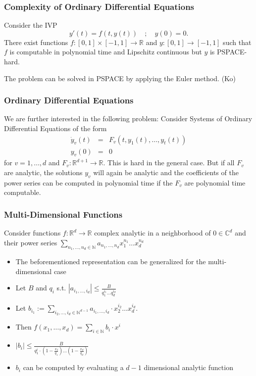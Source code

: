 \documentclass[handout,xcolor=pdftex,dvipsnames,table]{beamer}
\newcommand{\N}{\ensuremath{\mathbb{N}}}
\newcommand{\RR}{\ensuremath{\mathbb{R}}}
\newcommand{\C}{\ensuremath{\mathbb{C}}}
\newcommand{\abs}[1]{\left|#1\right|}
\begin{document}
\begin{frame}
\frametitle{Complexity of Ordinary Differential Equations}
\begin{theorem}[Kawamura, 2010]
Consider the IVP
$$
y'(t)=f(t,y(t)) \quad;\quad y(0)=0.
$$
\pause
There exist functions $f: [0,1] \times [-1,1] \to \RR$ and $y: [0,1] \to [-1,1]$
such that $f$ is computable in polynomial time and Lipschitz continuous
but $y$ is PSPACE-hard.
\end{theorem}
The problem can be solved in PSPACE by applying the Euler method. (Ko)
\end{frame}
\begin{frame}
  \frametitle{Ordinary Differential Equations}
  We are further interested in the following problem:\newline
Consider Systems of Ordinary Differential Equations of the form
\begin{eqnarray*}
  \dot y_v(t) &=& F_v(t, y_1(t), \dots, y_t(t)) \\
  y_v(0) &=& 0 
\end{eqnarray*}
for $v=1,\dots,d$ and $F_v : \RR^{d+1} \to \RR$.
\pause
This is hard in the general case.
\pause
But if all $F_v$ are analytic, the solutions $y_v$ will again be analytic and the coefficients of the power series
can be computed in polynomial time if the $F_v$ are polynomial time computable.
  \end{frame}
\begin{frame}
  \frametitle{Multi-Dimensional Functions}
  Consider functions $f: \RR^d \to \RR$ complex analytic in a neighborhood of $0 \in \C^d$ and their power series $\sum_{n_1, \dots, n_d \in \N} a_{n_1,\dots,n_d}x_1^{ n_1 } \dots x_d^{ n_d }$
  \begin{itemize}
  \item The beforementioned representation can be generalized for the multi-dimensional case
    \item Let $B$ and $q_i$ s.t. 
$ \abs{a_{i_1, \dots, i_d}} \leq \frac{B}{q_1^{i_1} \dots q_d^{i_d}} $
    \item Let $b_{i_1} := \sum_{i_2, \dots, i_d \in \N^{d-1}} a_{i_1, \dots, i_d} \cdot x_2^{i_2} \dots x_d^{i_d}$.
    \item Then $f(x_1, \dots, x_d) = \sum_{i \in \N} b_i\cdot x^i$
\item $\abs{b_i} \leq \frac{B}{q_1^i \cdot (1-\frac{x_2}{q_1}) \dots (1-\frac{x_d}{q_d})}$
  \item $b_i$ can be computed by evaluating a $d-1$ dimensional analytic function
  \end{itemize}
  \end{frame}
\end{document}
